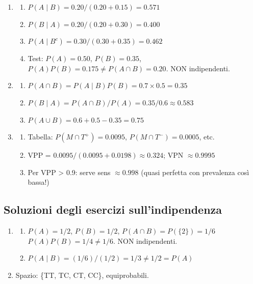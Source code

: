 \documentclass[
  italian,
  letterpaper,
  a4paper,
  11pt,
  open=any]{scrbook}
\providecommand{\tightlist}{%
  \setlength{\itemsep}{0pt}\setlength{\parskip}{0pt}}
\theoremstyle{plain}
\theoremstyle{definition}
\theoremstyle{definition}
\theoremstyle{remark}
\begin{document}
\begin{tcolorbox}
\begin{enumerate}
\def\labelenumi{\arabic{enumi}.}
\setcounter{enumi}{5}
\tightlist
\item
  \begin{enumerate}
  \def\labelenumii{\alph{enumii}.}
  \tightlist
  \item
    \(P(A \mid B) = 0.20 / (0.20 + 0.15) = 0.571\)
  \item
    \(P(B \mid A) = 0.20 / (0.20 + 0.30) = 0.400\)
  \item
    \(P(A \mid B^c) = 0.30 / (0.30 + 0.35) = 0.462\)
  \item
    Test: \(P(A) = 0.50\), \(P(B) = 0.35\),
    \(P(A) P(B) = 0.175 \neq P(A \cap B) = 0.20\). NON indipendenti.
  \end{enumerate}
\item
  \begin{enumerate}
  \def\labelenumii{\alph{enumii}.}
  \tightlist
  \item
    \(P(A \cap B) = P(A \mid B) P(B) = 0.7 \times 0.5 = 0.35\)
  \item
    \(P(B \mid A) = P(A \cap B) / P(A) = 0.35 / 0.6 \approx 0.583\)
  \item
    \(P(A \cup B) = 0.6 + 0.5 - 0.35 = 0.75\)
  \end{enumerate}
\item
  \begin{enumerate}
  \def\labelenumii{\alph{enumii}.}
  \tightlist
  \item
    Tabella: \(P(M \cap T^+) = 0.0095\), \(P(M \cap T^-) = 0.0005\),
    etc.
  \item
    VPP = \(0.0095 / (0.0095 + 0.0198) \approx 0.324\); VPN
    \(\approx 0.9995\)
  \item
    Per VPP \textgreater{} 0.9: serve sens \(\approx 0.998\) (quasi
    perfetta con prevalenza così bassa!)
  \end{enumerate}
\end{enumerate}

\subsection*{Soluzioni degli esercizi
sull'indipendenza}\label{soluzioni-degli-esercizi-sullindipendenza}

\begin{enumerate}
\def\labelenumi{\arabic{enumi}.}
\setcounter{enumi}{8}
\tightlist
\item
  \begin{enumerate}
  \def\labelenumii{\alph{enumii}.}
  \tightlist
  \item
    \(P(A) = 1/2\), \(P(B) = 1/2\), \(P(A \cap B) = P(\{2\}) = 1/6\)
    \(P(A) P(B) = 1/4 \neq 1/6\). NON indipendenti.
  \item
    \(P(A \mid B) = (1/6) / (1/2) = 1/3 \neq 1/2 = P(A)\)
  \end{enumerate}
\item
  Spazio: \{TT, TC, CT, CC\}, equiprobabili.


\end{enumerate}
\end{tcolorbox}
\end{document}
